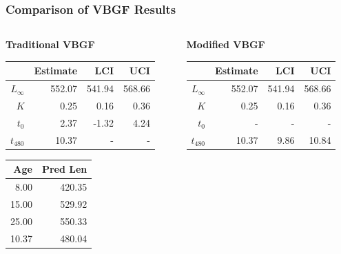 \documentclass[xcolor=dvipsnames]{beamer}\usepackage[]{graphicx}\usepackage[]{color}
\begin{document}
\begin{frame}[fragile, t]
\frametitle{Comparison of VBGF Results}
\begin{columns}
\begin{column}{0.5\textwidth}
\textbf{Traditional VBGF}
\begin{table}[ht]
\centering
\begin{tabular}{rrrr}
  \hline
 & Estimate & LCI & UCI \\ 
  \hline
$L_{\infty}$ & 552.07 & 541.94 & 568.66 \\ 
  $K$ & 0.25 & 0.16 & 0.36 \\ 
  $t_{0}$ & 2.37 & -1.32 & 4.24 \\ 
  $t_{480}$ & 10.37 & - & - \\ 
   \hline
\end{tabular}
\end{table}

\smallskip
\begin{table}[ht]
\centering
\begin{tabular}{rr}
  \hline
Age & Pred Len \\ 
  \hline
8.00 & 420.35 \\ 
  15.00 & 529.92 \\ 
  25.00 & 550.33 \\ 
  10.37 & 480.04 \\ 
   \hline
\end{tabular}
\end{table}

\end{column}
\begin{column}{0.5\textwidth}
\textbf{Modified VBGF}
\begin{table}[ht]
\centering
\begin{tabular}{rrrr}
  \hline
 & Estimate & LCI & UCI \\ 
  \hline
$L_{\infty}$ & 552.07 & 541.94 & 568.66 \\ 
  $K$ & 0.25 & 0.16 & 0.36 \\ 
  $t_{0}$ & - & - & - \\ 
  $t_{480}$ & 10.37 & 9.86 & 10.84 \\ 
   \hline
\end{tabular}
\end{table}


\end{column}
\end{columns}
\end{frame}
\end{document}
